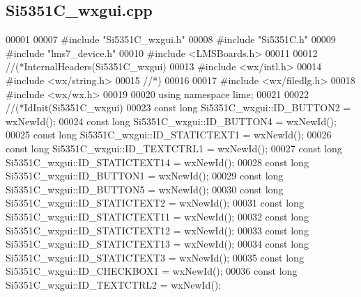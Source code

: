 \subsection{Si5351\+C\+\_\+wxgui.\+cpp}
\label{Si5351C__wxgui_8cpp_source}

\begin{DoxyCode}
00001 
00007 \textcolor{preprocessor}{#include "Si5351C_wxgui.h"}
00008 \textcolor{preprocessor}{#include "Si5351C.h"}
00009 \textcolor{preprocessor}{#include "lms7_device.h"}
00010 \textcolor{preprocessor}{#include <LMSBoards.h>}
00011 
00012 \textcolor{comment}{//(*InternalHeaders(Si5351C\_wxgui)}
00013 \textcolor{preprocessor}{#include <wx/intl.h>}
00014 \textcolor{preprocessor}{#include <wx/string.h>}
00015 \textcolor{comment}{//*)}
00016 
00017 \textcolor{preprocessor}{#include <wx/filedlg.h>}
00018 \textcolor{preprocessor}{#include <wx/wx.h>}
00019 
00020 \textcolor{keyword}{using namespace }lime;
00021 
00022 \textcolor{comment}{//(*IdInit(Si5351C\_wxgui)}
00023 \textcolor{keyword}{const} \textcolor{keywordtype}{long} Si5351C_wxgui::ID_BUTTON2 = wxNewId();
00024 \textcolor{keyword}{const} \textcolor{keywordtype}{long} Si5351C_wxgui::ID_BUTTON4 = wxNewId();
00025 \textcolor{keyword}{const} \textcolor{keywordtype}{long} Si5351C_wxgui::ID_STATICTEXT1 = wxNewId();
00026 \textcolor{keyword}{const} \textcolor{keywordtype}{long} Si5351C_wxgui::ID_TEXTCTRL1 = wxNewId();
00027 \textcolor{keyword}{const} \textcolor{keywordtype}{long} Si5351C_wxgui::ID_STATICTEXT14 = wxNewId();
00028 \textcolor{keyword}{const} \textcolor{keywordtype}{long} Si5351C_wxgui::ID_BUTTON1 = wxNewId();
00029 \textcolor{keyword}{const} \textcolor{keywordtype}{long} Si5351C_wxgui::ID_BUTTON5 = wxNewId();
00030 \textcolor{keyword}{const} \textcolor{keywordtype}{long} Si5351C_wxgui::ID_STATICTEXT2 = wxNewId();
00031 \textcolor{keyword}{const} \textcolor{keywordtype}{long} Si5351C_wxgui::ID_STATICTEXT11 = wxNewId();
00032 \textcolor{keyword}{const} \textcolor{keywordtype}{long} Si5351C_wxgui::ID_STATICTEXT12 = wxNewId();
00033 \textcolor{keyword}{const} \textcolor{keywordtype}{long} Si5351C_wxgui::ID_STATICTEXT13 = wxNewId();
00034 \textcolor{keyword}{const} \textcolor{keywordtype}{long} Si5351C_wxgui::ID_STATICTEXT3 = wxNewId();
00035 \textcolor{keyword}{const} \textcolor{keywordtype}{long} Si5351C_wxgui::ID_CHECKBOX1 = wxNewId();
00036 \textcolor{keyword}{const} \textcolor{keywordtype}{long} Si5351C_wxgui::ID_TEXTCTRL2 = wxNewId();

\end{DoxyCode}
